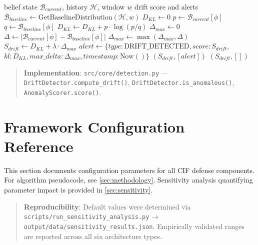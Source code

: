 \documentclass[
]{article}
\begin{document}
\begin{algorithm}
\caption{Belief Drift Detection}
\label{alg:drift-impl}
\begin{algorithmic}[1]
\Require belief state $\mathcal{B}_{current}$, history $\mathcal{H}$, window $w$
\Ensure drift score and alerts
  \State $\mathcal{B}_{baseline} \gets \text{GetBaselineDistribution}(\mathcal{H}, w)$
  \State {}
  \State $D_{KL} \gets 0$
    \State $p \gets \mathcal{B}_{current}[\phi]$
    \State $q \gets \mathcal{B}_{baseline}[\phi]$
      \State $D_{KL} \gets D_{KL} + p \cdot \log(p / q)$
    \EndIf
  \EndFor
  \State {}
  \State $\Delta_{max} \gets 0$
    \State $\Delta \gets |\mathcal{B}_{current}[\phi] - \mathcal{B}_{baseline}[\phi]|$
    \State $\Delta_{max} \gets \max(\Delta_{max}, \Delta)$
  \EndFor
  \State {}
  \State $S_{drift} \gets D_{KL} + \lambda \cdot \Delta_{max}$
    \State $alert \gets \{type: \text{DRIFT\_DETECTED}, score: S_{drift},$
    \State \quad\quad\quad\quad $kl: D_{KL}, max\_delta: \Delta_{max}, timestamp: \text{Now}()\}$
    \Return $(S_{drift}, [alert])$
  \EndIf
  \Return $(S_{drift}, [])$
\EndFunction
\end{algorithmic}
\end{algorithm}

\begin{quote}
\textbf{Implementation}: \texttt{src/core/detection.py} ---
\texttt{DriftDetector.compute\_drift()},
\texttt{DriftDetector.is\_anomalous()}, \texttt{AnomalyScorer.score()}.
\end{quote}

\newpage

\newpage

\section{Framework Configuration Reference}\label{sec:config-params}

This section documents configuration parameters for all CIF defense
components. For algorithm pseudocode, see \cref{sec:methodology}.
Sensitivity analysis quantifying parameter impact is provided in
\cref{sec:sensitivity}.

\begin{quote}
\textbf{Reproducibility}: Default values were determined via
\texttt{scripts/run\_sensitivity\_analysis.py} →
\texttt{output/data/sensitivity\_results.json}. Empirically validated
ranges are reported across all six architecture types.
\end{quote}
\end{document}
